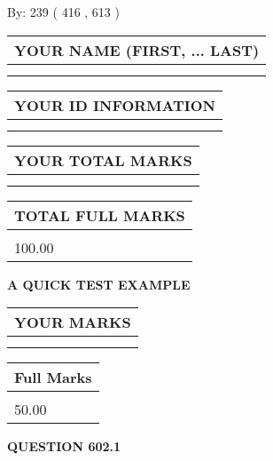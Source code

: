 \documentclass[12pt]{article}
\begin{document}
   
\hspace{1.0in} By: 
 239 ( 416 ,  613 )
   
   
   
   
\newpage 
\setcounter{page}{ 
   602001 } 
   
   
   
   
\noindent\begin{tabular}{|l|}
\hline
YOUR NAME (FIRST, ... LAST)  \\
\hline
 \\ 
 \\ 
\hline
\end{tabular}
\hspace{0.05in} \begin{tabular}{|l|}
\hline
 YOUR   ID   INFORMATION  \\
\hline
 \\ 
 \\ 
\hline
\end{tabular}
   
   
\vspace{0.2in}\noindent\begin{tabular}{|l|}
\hline
YOUR TOTAL MARKS  \\
\hline
 \\ 
 \\ 
\hline
\end{tabular}
\hspace{0.05in} \begin{tabular}{|l|}
\hline
TOTAL FULL MARKS  \\
\hline
 \\ 
100.00 \\
\hline
\end{tabular}
   
   
 \vspace{0.2in}
{\LARGE {\textbf{ A QUICK TEST EXAMPLE}}}
   
   
  
\vspace{0.2in}
  
\noindent\begin{tabular}{|l|}
\hline
 YOUR MARKS  \\
\hline
 \\ 
 \\ 
\hline
\end{tabular}
\hspace{0.05in} \begin{tabular}{|l|}
\hline
 Full Marks  \\
\hline
 \\ 
50.00 \\
\hline
\end{tabular}
{\textbf{\Large{QUESTION
602.1 
}}}
  
\end{document}

